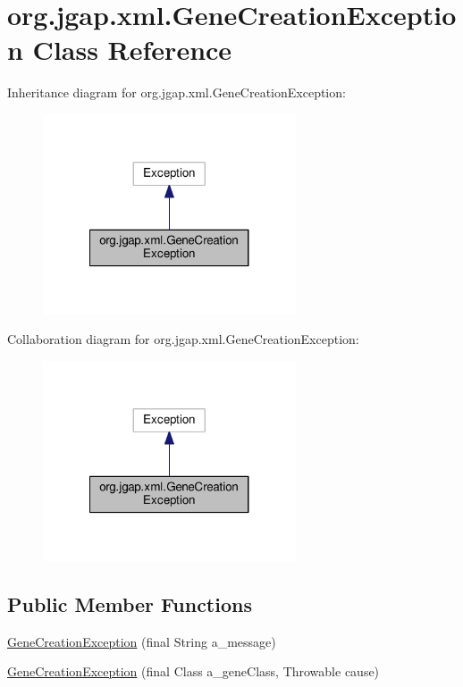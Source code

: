 \hypertarget{classorg_1_1jgap_1_1xml_1_1_gene_creation_exception}{\section{org.\-jgap.\-xml.\-Gene\-Creation\-Exception Class Reference}
\label{classorg_1_1jgap_1_1xml_1_1_gene_creation_exception}
}


Inheritance diagram for org.\-jgap.\-xml.\-Gene\-Creation\-Exception\-:
\nopagebreak
\begin{figure}[H]
\begin{center}
\leavevmode
\includegraphics[width=212pt]{classorg_1_1jgap_1_1xml_1_1_gene_creation_exception__inherit__graph}
\end{center}
\end{figure}


Collaboration diagram for org.\-jgap.\-xml.\-Gene\-Creation\-Exception\-:
\nopagebreak
\begin{figure}[H]
\begin{center}
\leavevmode
\includegraphics[width=212pt]{classorg_1_1jgap_1_1xml_1_1_gene_creation_exception__coll__graph}
\end{center}
\end{figure}
\subsection*{Public Member Functions}
\begin{DoxyCompactItemize}
\item 
\hyperlink{classorg_1_1jgap_1_1xml_1_1_gene_creation_exception_ab1d0f2c9fe8f1789f8fe45e705d75ef1}{Gene\-Creation\-Exception} (final String a\-\_\-message)
\item 
\hyperlink{classorg_1_1jgap_1_1xml_1_1_gene_creation_exception_a173bd5c4687b72a97534b81280e8608b}{Gene\-Creation\-Exception} (final Class a\-\_\-gene\-Class, Throwable cause)
\end{DoxyCompactItemize}
